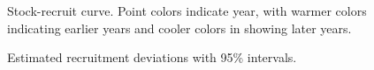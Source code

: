 \documentclass[
]{scrartcl}
\begin{document}
\begin{figure}


\caption{\label{fig-SRcurve}Stock-recruit curve. Point colors indicate
year, with warmer colors indicating earlier years and cooler colors in
showing later years.}

\end{figure}%

\begin{figure}


\caption{\label{fig-recdevs_err}Estimated recruitment deviations with
95\% intervals.}

\end{figure}%
\end{document}
